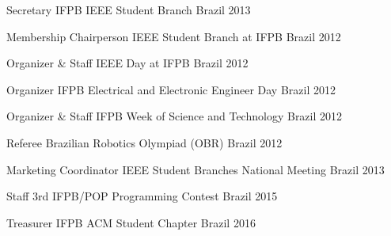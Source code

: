 

\begin{cvhonors}

  \cvhonor
    {Secretary} %
    {IFPB IEEE Student Branch} %
    {Brazil} %
    {2013} %

  \cvhonor
    {Membership Chairperson} %
    {IEEE Student Branch at IFPB} %
    {Brazil} %
    {2012} %
    
\cvhonor
    {Organizer \& Staff} %
    {IEEE Day at IFPB} %
    {Brazil} %
    {2012} %
    
  \cvhonor
    {Organizer} %
    {IFPB Electrical and Electronic Engineer Day} %
    {Brazil} %
    {2012} %
        
  \cvhonor
    {Organizer \& Staff} %
    {IFPB Week of Science and Technology} %
    {Brazil} %
    {2012} %
    
  \cvhonor
    {Referee} %
    {Brazilian Robotics Olympiad (OBR)} %
    {Brazil} %
    {2012} %
    
  \cvhonor
    {Marketing Coordinator} %
    {IEEE Student Branches National Meeting} %
    {Brazil} %
    {2013} %

  \cvhonor
    {Staff} %
    {3rd IFPB/POP Programming Contest} %
    {Brazil} %
    {2015} %

  \cvhonor
    {Treasurer} %
    {IFPB ACM Student Chapter} %
    {Brazil} %
    {2016} %


\end{cvhonors}
